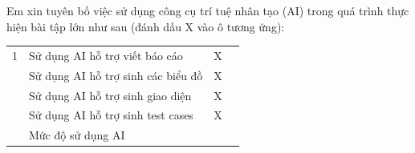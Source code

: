
Em xin tuyên bố việc sử dụng công cụ trí tuệ nhân tạo (AI) trong quá trình thực hiện bài tập lớn như sau (đánh dấu X
vào ô tương ứng):

\vspace{0.4cm}
\begin{center}
  \renewcommand{\arraystretch}{1.5}
  \begin{tabularx}{\linewidth}{cL>{\centering\arraybackslash}p{1.8cm}>{\centering\arraybackslash}p{1.8cm}}
    \toprule
     &  &  &  \\  & Sử dụng AI hỗ trợ viết báo cáo & X & \\  & Sử dụng AI hỗ trợ sinh các biểu đồ & X & \\  & Sử dụng AI hỗ trợ sinh giao diện & X & \\  & Sử dụng AI hỗ trợ sinh test cases & X & \\  & Mức độ sử dụng AI &  \\ \bottomrule
  \end{tabularx}
\end{center}

